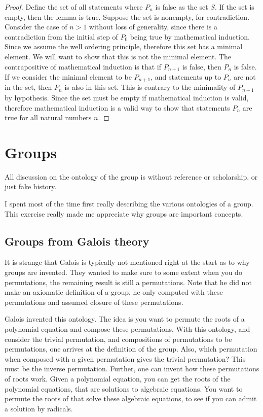 \documentclass{tufte-book}
\begin{document}
\begin{proof}
  Define the set of all statements where $P_n$ is false as the set $S$. If the set is empty, then the lemma is true.
  Suppose the set is nonempty, for contradiction.
  Consider the case of $n > 1$ without loss of generality, since there is a contradiction from the initial step of $P_0$ being true 
  by mathematical induction.
  Since we assume the well ordering principle, therefore this set has a minimal element.
  We will want to show that this is not the minimal element.
  The contrapositive of mathematical induction is that if $P_{n+1}$ is false, then $P_{n}$ is false.
  If we consider the minimal element to be $P_{n+1}$, and statements up to $P_{n}$ are not in the set, then $P_{n}$ is also in this set.
  This is contrary to the minimality of $P_{n+1}$ by hypothesis.
  Since the set must be empty if mathematical induction is valid, therefore mathematical induction is a valid way to show that statements $P_n$ are true for all natural numbers $n$.
\end{proof}

\chapter{Groups}
\label{ch:group}

All discussion on the ontology of the group is without reference or scholarship, or just fake history.

I spent most of the time first really describing the various ontologies of a group. This exercise really made me appreciate why groups are important concepts.

\section{Groups from Galois theory}\label{sec:groupsgalois}

It is strange that Galois is typically not mentioned right at the start as to why groups are invented. They wanted to make sure to some extent when you do permutations, the remaining result is still a permutations. Note that he did not make an axiomatic definition of a group, he only computed with these permutations and assumed closure of these permutations.

Galois invented this ontology. The idea is you want to permute the roots of a polynomial equation and compose these permutations. With this ontology, and consider the trivial permutation, and compositions of permutations to be permutations, one arrives at the definition of the group. Also, which permutation when composed with a given permutation gives the trivial permutation? This must be the inverse permutation. Further, one can invent how these permutations of roots work. Given a polynomial equation, you can get the roots of the polynomial equations, that are solutions to algebraic equations. You want to permute the roots of that solve these algebraic equations, to see if you can admit a solution by radicals.
\end{document}

